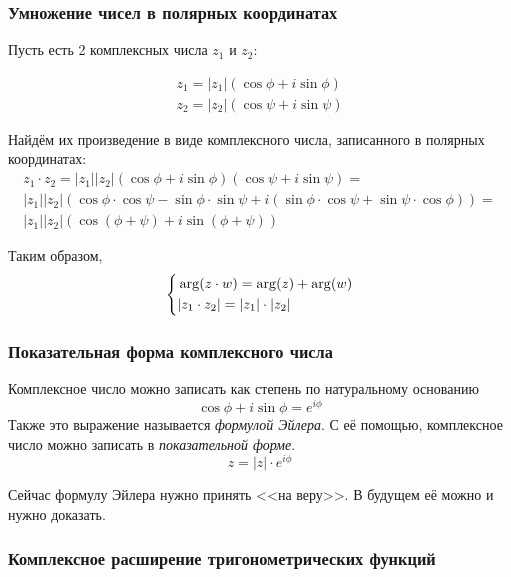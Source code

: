 \subsubsection*{Умножение чисел в полярных координатах}

Пусть есть 2 комплексных числа $z_1$ и $z_2$:

\begin{align*}
    z_1 = |z_1|(\cos\phi + i \sin\phi)
    \\
    z_2 = |z_2|(\cos\psi + i \sin\psi)
\end{align*}

Найдём их произведение в виде комплексного числа, записанного в полярных координатах:
\begin{multline}
    z_1 \cdot z_2 = |z_1||z_2|(\cos\phi + i \sin\phi)(\cos\psi + i \sin\psi) = \\
    |z_1||z_2|(\cos\phi \cdot \cos\psi - \sin\phi \cdot \sin\psi + i(\sin\phi \cdot \cos\psi + \sin\psi \cdot \cos\phi)) = \\
    |z_1||z_2|(\cos(\phi + \psi) + i \sin(\phi + \psi))
\end{multline}

Таким образом,
$$
    \left\{\begin{aligned}
    &\arg(z \cdot w) = \arg(z) + \arg(w)
    \\
    &|z_1 \cdot z_2| = |z_1| \cdot |z_2|
    \end{aligned}\right.
$$

\subsubsection*{Показательная форма комплексного числа}

\begin{definition}
    Комплексное число можно записать как степень по натуральному основанию
    $$
        \cos \phi + i \sin \phi = e^{i \phi}
    $$
    Также это выражение называется \textit{формулой Эйлера}. С её помощью, комплексное число можно записать в \textit{показательной форме}.
    $$
        z = |z| \cdot e^{i \phi}
    $$
\end{definition}

\begin{note}
    Сейчас формулу Эйлера нужно принять <<на веру>>. В будущем её можно и нужно доказать.
\end{note}

\subsubsection*{Комплексное расширение тригонометрических функций}

